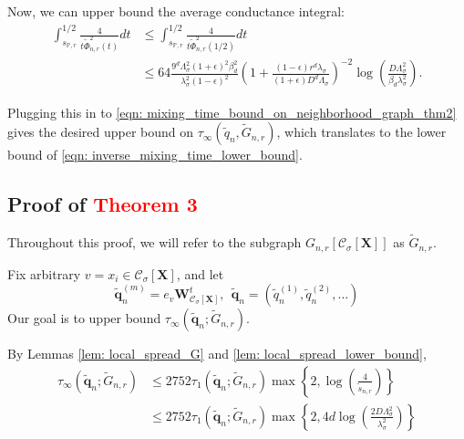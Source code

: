 \documentclass{article}
\newcommand{\1}{\mathbf{1}}
\newcommand{\qbf}{\mathbf{q}}
\newcommand{\Xbf}{\mathbf{X}}
\newcommand{\Wbf}{\mathbf{W}}
\newcommand{\Pbb}{\mathbb{P}}
\newcommand{\Cset}{\mathcal{C}}
\newcommand{\Csig}{\Cset_{\sigma}}
\theoremstyle{aldenthm}
\begin{document}
Now, we can upper bound the average conductance integral:
\begin{align*}
\int_{ s_{\Pbb,r}}^{1/2} \frac{4}{t\widetilde{\Phi}_{n,r}^2(t)} dt & \leq \int_{ s_{\Pbb,r}}^{1/2} \frac{4}{t\widetilde{\Phi}_{n,r}^2(1/2)} dt \\
& \leq 64\frac{9^d\Lambda_{\sigma}^2(1 + \epsilon)^2\beta_d^2}{\lambda_{\sigma}^2(1 - \epsilon)^2} \left(1 + \frac{(1 - \epsilon)r^d\lambda_{\sigma}}{(1 + \epsilon)D^d\Lambda_{\sigma}}\right)^{-2} \log\left(\frac{D \Lambda_{\sigma}^2}{\beta_d \lambda_{\sigma}^2}\right).
\end{align*}

Plugging this in to \eqref{eqn: mixing_time_bound_on_neighborhood_graph_thm2} gives the desired upper bound on $\tau_{\infty}(\widetilde{q}_n, \widetilde{G}_{n,r})$, which translates to the lower bound of \eqref{eqn: inverse_mixing_time_lower_bound}.

\subsection{Proof of \textcolor{red}{Theorem 3}}
Throughout this proof, we will refer to the subgraph $G_{n,r}\left[\Csig[\Xbf]\right]$ as $\widetilde{G}_{n,r}$. 

Fix arbitrary $v = x_i \in \Csig[\Xbf]$, and let
\begin{equation*}
\widetilde{\qbf}_n^{(m)} = e_v \Wbf_{\Csig[\Xbf]}^t, ~~ \widetilde{\qbf}_n = (\widetilde{q}_n^{(1)}, \widetilde{q}_n^{(2)}, \ldots)
\end{equation*}
Our goal is to upper bound $\tau_{\infty}(\widetilde{\qbf}_n; \widetilde{G}_{n,r})$.

By Lemmas \ref{lem: local_spread_G} and \ref{lem: local_spread_lower_bound},
\begin{align*}
\tau_{\infty}(\widetilde{\qbf}_n; \widetilde{G}_{n,r}) & \leq 2752 \tau_{1}(\widetilde{\qbf}_n; \widetilde{G}_{n,r}) \max\left\{2, \log\left(\frac{4}{\widetilde{s}_{n,r}}\right) \right\} \nonumber \\
& \leq 2752 \tau_{1}(\widetilde{\qbf}_n; \widetilde{G}_{n,r}) \max\left\{2, 4d\log\left(\frac{2D \Lambda_{\sigma}^2}{\lambda_{\sigma}^2}\right) \right\}
\end{align*} 
\end{document}
